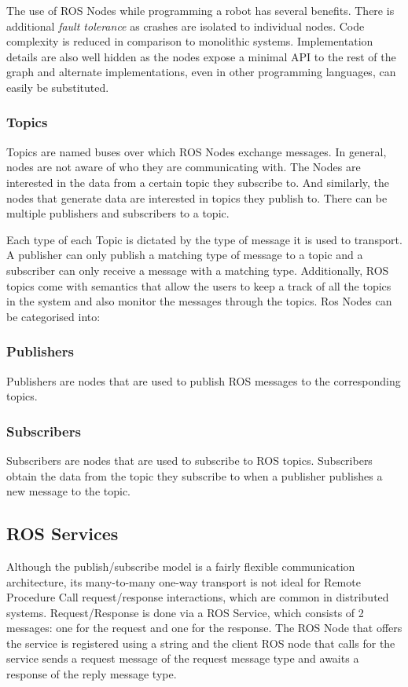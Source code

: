 \documentclass{LTHthesis}
\begin{document}
        The use of ROS Nodes while programming a robot has several benefits. There is additional \emph{fault tolerance} as crashes are isolated to individual nodes. Code complexity is reduced in comparison to monolithic systems. Implementation details are also well hidden as the nodes expose a minimal API to the rest of the graph and alternate implementations, even in other programming languages, can easily be substituted.
            \subsubsection{Topics}
            Topics are named buses over which ROS Nodes exchange messages. In general, nodes are not aware of who they are communicating with. The Nodes are interested in the data from a certain topic they subscribe to. And similarly, the nodes that generate data are interested in topics they publish to. There can be multiple publishers and subscribers to a topic. 

            Each type of each Topic is dictated by the type of message it is used to transport. A publisher can only publish a matching type of message to a topic and a subscriber can only receive a message with a matching type. Additionally, ROS topics come with semantics that allow the users to keep a track of all the topics in the system and also monitor the messages through the topics. 
            Ros Nodes can be categorised into:
            \\
            \subsubsection{Publishers}
                Publishers are nodes that are used to publish ROS messages to the corresponding topics. 
            \\
            \subsubsection{Subscribers}
                Subscribers are nodes that are used to subscribe to ROS topics. Subscribers obtain the data from the topic they subscribe to when a publisher publishes a new message to the topic.
            \\
            \subsection{ROS Services}
                Although the publish/subscribe model is a fairly flexible communication architecture, its many-to-many one-way transport is not ideal for Remote Procedure Call request/response interactions, which are common in distributed systems. Request/Response is done via a ROS Service, which consists of 2 messages: one for the request and one for the response. The ROS Node that offers the service is registered using a string and the client ROS node that calls for the service sends a request message of the request message type and awaits a response of the reply message type. 
\end{document}
